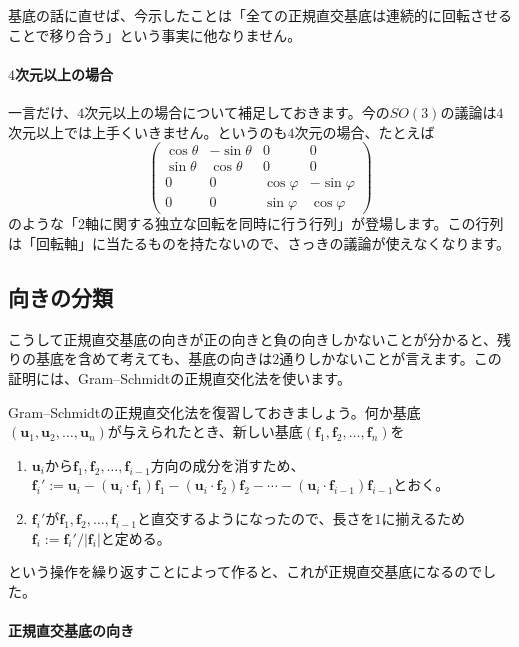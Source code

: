 基底の話に直せば、今示したことは「全ての正規直交基底は連続的に回転させることで移り合う」という事実に他なりません。

\paragraph{$4$次元以上の場合}

一言だけ、$4$次元以上の場合について補足しておきます。今の$SO(3)$の議論は$4$次元以上では上手くいきません。というのも$4$次元の場合、たとえば
\[
\begin{pmatrix}
\cos \theta & - \sin \theta & 0 & 0 \\
\sin \theta & \cos \theta & 0 & 0 \\
0 & 0 & \cos \varphi & -\sin \varphi \\
0 & 0 & \sin \varphi & \cos \varphi
\end{pmatrix}
\]
のような「$2$軸に関する独立な回転を同時に行う行列」が登場します。この行列は「回転軸」に当たるものを持たないので、さっきの議論が使えなくなります。


\subsection{向きの分類}

こうして正規直交基底の向きが正の向きと負の向きしかないことが分かると、残りの基底を含めて考えても、基底の向きは$2$通りしかないことが言えます。この証明には、Gram--Schmidtの正規直交化法を使います。

Gram--Schmidtの正規直交化法を復習しておきましょう。何か基底$(\bm{u}_1, \bm{u}_2, \ldots, \bm{u}_n)$が与えられたとき、新しい基底$(\bm{f}_1, \bm{f}_2, \ldots, \bm{f}_n)$を
\begin{enumerate}
\item $\bm{u}_i$から$\bm{f}_1, \bm{f}_2, \ldots, \bm{f}_{i - 1}$方向の成分を消すため、$\bm{f}_i' := \bm{u}_i - (\bm{u}_i \cdot \bm{f}_1) \bm{f}_1 - (\bm{u}_i \cdot \bm{f}_2) \bm{f}_2 - \cdots - (\bm{u}_i \cdot \bm{f}_{i - 1}) \bm{f}_{i - 1}$とおく。
\item $\bm{f}_i'$が$\bm{f}_1, \bm{f}_2, \ldots, \bm{f}_{i - 1}$と直交するようになったので、長さを$1$に揃えるため$\bm{f}_i := \bm{f}_i' / |\bm{f}_i|$と定める。
\end{enumerate}
という操作を繰り返すことによって作ると、これが正規直交基底になるのでした。

\paragraph{正規直交基底の向き}

